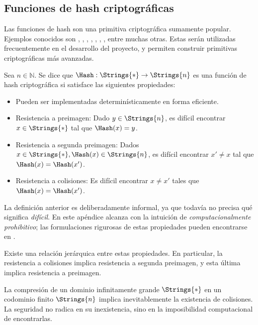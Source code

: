 
\subsection{Funciones de hash criptográficas}

Las funciones de hash son una primitiva criptográfica sumamente popular. Ejemplos conocidos son \MDFive, \SHAOne, \SHATwoFiveSix, \BLAKETwo, \BLAKEThree, \RIPEMD, \PoseidonHash, entre muchas otras. Estas serán utilizadas frecuentemente en el desarrollo del proyecto, y permiten construir primitivas criptográficas más avanzadas.

\begin{definition}
	Sea $n \in \mathbb{N}$. Se dice que $\Hash: \Strings{*} \to \Strings{n}$ es una función de hash criptográfica si satisface las siguientes propiedades:
	\begin{itemize}[noitemsep]
		\item Pueden ser implementadas determinísticamente en forma eficiente.
		\item Resistencia a preimagen: Dado $y \in \Strings{n}$, es difícil encontrar $x \in \Strings{*}$ tal que $\Hash(x) = y$.
		\item Resistencia a segunda preimagen: Dados $x \in \Strings{*}, \Hash(x) \in \Strings{n}$, es difícil encontrar $x' \neq x$ tal que $\Hash(x) = \Hash(x')$.
		\item Resistencia a colisiones: Es difícil encontrar $x \neq x'$ tales que $\Hash(x) = \Hash(x')$.
	\end{itemize}
\end{definition}

La definición anterior es deliberadamente informal, ya que todavía no precisa qué significa \textit{difícil}. En este apéndice alcanza con la intuición de \textit{computacionalmente prohibitivo}; las formulaciones rigurosas de estas propiedades pueden encontrarse en \cite{hac,katz}.

Existe una relación jerárquica entre estas propiedades. En particular, la resistencia a colisiones implica resistencia a segunda preimagen, y esta última implica resistencia a preimagen.

La compresión de un dominio infinitamente grande $\Strings{*}$ en un codominio finito $\Strings{n}$ implica inevitablemente la existencia de colisiones. La seguridad no radica en su inexistencia, sino en la imposibilidad computacional de encontrarlas.

